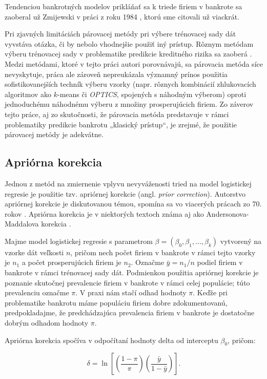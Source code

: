 Tendenciou bankrotných modelov prikláňať sa k triede firiem v bankrote sa zaoberal už Zmijewski v práci z roku 1984 \cite{zmijewski}, ktorú sme citovali už viackrát.

Pri zjavných limitáciách párovacej metódy pri výbere trénovacej sady dát vyvstáva otázka, či by nebolo vhodnejšie použiť iný prístup.
Rôznym metódam výberu trénovacej sady v problematike predikcie kreditného rizika sa zaoberá \cite{protopapadakis}.
Medzi metódami, ktoré v tejto práci autori porovnávajú, sa párovacia metóda síce nevyskytuje, práca ale zároveň nepreukázala významný prínos použitia sofistikovanejších techník výberu vzorky
(napr. rôznych kombinácií zhlukovacích algoritmov ako \(k\)-means či \emph{OPTICS}, spojených s náhodným výberom) oproti jednoduchému náhodnému výberu z množiny prosperujúcich firiem.
Zo záverov tejto práce, aj zo skutočnosti, že párovacia metóda predstavuje v rámci problematiky predikcie bankrotu „klasický prístup“, je zrejmé, že použitie párovacej metódy je adekvátne.

\subsection{Apriórna korekcia}

Jednou z metód na zmiernenie vplyvu nevyváženosti tried na model logistickej regresie je použitie tzv. apriórnej korekcie (angl. \emph{prior correction}).
Autorstvo apriórnej korekcie je diskutovanou témou, spomína sa vo viacerých prácach zo 70. rokov \cite{manski, bishop, anderson}.
Apriórna korekcia je v niektorých textoch známa aj ako Andersonova-Maddalova korekcia \cite{maddala}.

Majme model logistickej regresie s parametrom \(\beta = (\beta_0, \beta_1, \ldots, \beta_k) \) vytvorený na vzorke dát veľkosti \(n\),
pričom nech počet firiem v bankrote v rámci tejto vzorky je \(n_1\) a počet prosperujúcich firiem je \(n_2\).
Označme \( \bar{y} = n_1/n \) podiel firiem v bankrote v rámci trénovacej sady dát.
Podmienkou použitia apriórnej korekcie je poznanie skutočnej prevalencie firiem v bankrote v rámci celej populácie; túto prevalenciu označme \(\pi\).
V praxi nám stačí odhad hodnoty \(\pi\).
Keďže pri problematike bankrotu máme populáciu firiem dobre zdokumentovanú, predpokladajme, že predchádzajúca prevalencia firiem v bankrote je dostatočne dobrým odhadom hodnoty \(\pi\).

Apriórna korekcia spočíva v odpočítaní hodnoty delta od interceptu \(\beta_0\), pričom:

\[
    \delta = \ln \left[ \left( \frac{1 - \pi}{\pi} \right) \left( \frac{\bar{y}}{1 - \bar{y}} \right) \right].
\]

